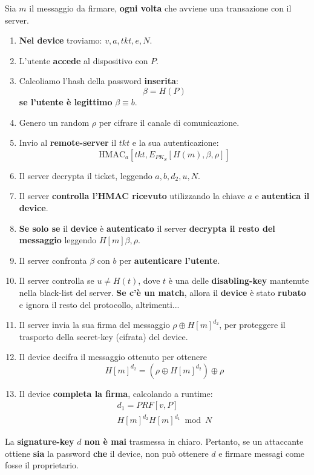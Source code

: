 \begin{corollary}\label{def:retrboost}
Sia $m$ il messaggio da firmare, \textbf{ogni volta} che avviene una transazione con il server.
\begin{enumerate}
    \item \textbf{Nel device} troviamo: $v,a,tkt,e,N$.
    \item L'utente \textbf{accede} al dispositivo con $P$.
    \item Calcoliamo l'hash della password \textbf{inserita}:\[\beta=H(P)\]
    \textbf{se l'utente è legittimo} $\beta\equiv b$.
    \item Genero un random $\rho$ per cifrare il canale di comunicazione.
    \item Invio al \textbf{remote-server} il $tkt$ e la sua autenticazione:
    \[\text{HMAC}_a[tkt, E_{PK_S}[H(m),\beta,\rho]]\]
    \item Il server decrypta il ticket, leggendo $a,b,d_2,u,N$.
    \item Il server \textbf{controlla l'HMAC ricevuto} utilizzando la chiave $a$ e \textbf{autentica il device}.
    \item \textbf{Se solo se} il \textbf{device} è \textbf{autenticato} il server \textbf{decrypta il resto del messaggio} leggendo $H[m]\beta,\rho$.
    \item Il server confronta $\beta$ con $b$ per \textbf{autenticare l'utente}.
    \item Il server controlla se $u\ne{H(t)}$, dove $t$ è una delle \textbf{disabling-key} mantenute nella black-list del server. \textbf{Se c'è un match}, allora il \textbf{device} è stato \textbf{rubato} e ignora il resto del protocollo, altrimenti...
    \item Il server invia la sua firma del messaggio $\rho\oplus H[m]^{d_2}$, per proteggere il trasporto della secret-key (cifrata) del device.
    \item Il device decifra il messaggio ottenuto per ottenere \[H[m]^{d_2}=(\rho\oplus H[m]^{d_2})\oplus \rho\]
    \item Il device \textbf{completa la firma}, calcolando a runtime:
    \begin{align*}
        d_1=PRF[v,P]\\
        H[m]^{d_2}H[m]^{d_1}\bmod{N}
    \end{align*}
    \end{enumerate}
\end{corollary}
\begin{remark}
La \textbf{signature-key} $d$ \textbf{non è mai} trasmessa in chiaro. Pertanto, se un attaccante ottiene \textbf{sia} la password \textbf{che} il device, non può ottenere $d$ e firmare messagi come fosse il proprietario.
\end{remark}
